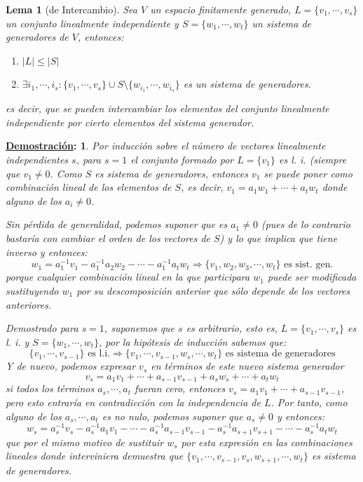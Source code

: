 \documentclass[10pt,a4paper,openright]{book}
\theoremstyle{break}
\newtheorem*{lema}{Lema}
\newtheorem*{demo}{\underline{Demostración}:}
\begin{document}
\begin{lema}[de Intercambio]
Sea $V$ un espacio finitamente generado, $L=\{v_1, \cdots, v_s\}$ un conjunto linealmente independiente y $S=\{w_1, \cdots, w_t\}$ un sistema de generadores de $V$, entonces:
\begin{enumerate}
\item $|L|\leq |S|$
\item $\exists i_1, \cdots, i_s : \{v_1, \cdots, v_s\}\cup S\setminus\{w_{i_1}, \cdots, w_{i_s}\}$ es un sistema de generadores.
\end{enumerate}
es decir, que se pueden intercambiar los elementos del conjunto linealmente independiente por cierto elementos del sistema generador.
\end{lema}
\begin{demo}
Por inducción sobre el número de vectores linealmente independientes $s$, para $s=1$ el conjunto formado por $L = \{v_1\}$ es l. i. (siempre que $v_1\neq 0$. Como $S$ es sistema de generadores, entonces $v_1$ se puede poner como combinación lineal de los elementos de $S$, es decir, $v_1=a_1w_1+\cdots+a_tw_t$ donde alguno de los $a_i \neq 0$.

Sin pérdida de generalidad, podemos suponer que es $a_1\neq 0$ (pues de lo contrario bastaría con cambiar el orden de los vectores de $S$) y lo que implica que tiene inverso y entonces:
$$
w_1=a_1^{-1}v_1-a_1^{-1}a_2w_2-\cdots- a_1^{-1}a_tw_t\Rightarrow \{v_1, w_2, w_3, \cdots, w_t\}\mbox{ es sist. gen.}
$$
porque cualquier combinación lineal en la que participara $w_1$ puede ser modificada sustituyendo $w_1$ por su descomposición anterior que sólo depende de los vectores anteriores.

Demostrado para $s=1$, suponemos que $s$ es arbitrario, esto es, $L = \{v_1, \cdots, v_s\}$ es l. i. y $S=\{w_1, \cdots, w_t\}$, por la hipótesis de inducción sabemos que:
$$
\{v_1, \cdots, v_{s-1}\}\mbox{ es l.i.}\Rightarrow \{v_1, \cdots, v_{s-1},w_s, \cdots,w_t\}\mbox{ es sistema de generadores}
$$
Y de nuevo, podemos expresar $v_s$ en términos de este nuevo sistema generador
$$
v_s=a_1v_1+\cdots+ a_{s-1}v_{s-1}+a_sw_s+\cdots+a_tw_t
$$
si todos los términos $a_s, \cdots, a_t$ fueran cero, entonces $v_s=a_1v_1+\cdots+a_{s-1}v_{s-1}$, pero esto entraría en contradicción con la independencia de $L$. Por tanto, como alguno de los $a_s, \cdots, a_t$ es no nulo, podemos suponer que $a_s\neq 0$ y entonces:
$$
w_s= a_s^{-1}v_s-a_s^{-1}a_1v_1-\cdots-a_s^{-1}a_{s-1}v_{s-1}- a_s^{-1}a_{s+1}v_{s+1}-\cdots- a_s^{-1}a_tw_t
$$
que por el mismo motivo de sustituir $w_s$ por esta expresión en las combinaciones lineales donde interviniera demuestra que $\{v_1, \cdots, v_{s-1}, v_s, w_{s+1}, \cdots, w_t\}$ es sistema de generadores.
\end{demo}
\end{document}
